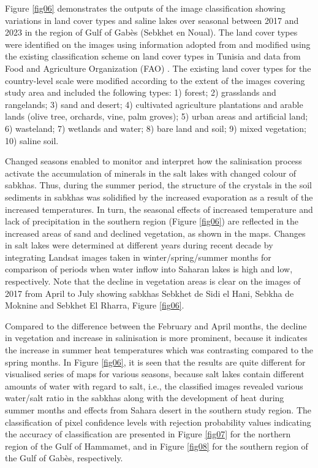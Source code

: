 \documentclass[environments,article,submit,pdftex,moreauthors]{Definitions/mdpi}
\begin{document}
Figure \ref{fig06} demonstrates the outputs of the image classification showing variations in land cover types and saline lakes over seasonal between 2017 and 2023 in the region of Gulf of Gabès (Sebkhet en Noual). The land cover types were identified on the images using information adopted from and modified using the existing classification scheme on land cover types in Tunisia \cite{plants10102031} and data from Food and Agriculture Organization (FAO) \cite{FAO}. The existing land cover types for the country-level scale were modified according to the extent of the images covering study area and included the following types: 1) forest; 2) grasslands and rangelands; 3) sand and desert; 4) cultivated agriculture plantations and arable lands (olive tree, orchards, vine, palm groves); 5) urban areas and artificial land; 6) wasteland; 7) wetlands and water; 8) bare land and soil; 9) mixed vegetation; 10) saline soil. 

Changed seasons enabled to monitor and interpret how the salinisation process activate the accumulation of minerals in the salt lakes with changed colour of sabkhas. Thus, during the summer period, the structure of the crystals in the soil sediments in sabkhas was solidified by the increased evaporation as a result of the increased temperatures. In turn, the seasonal effects of increased temperature and lack of precipitation in the southern region (Figure \ref{fig06}) are reflected in the increased areas of sand and declined vegetation, as shown in the maps. Changes in salt lakes were determined at different years during recent decade by integrating Landsat images taken in winter/spring/summer months for comparison of periods when water inflow into Saharan lakes is high and low, respectively. Note that the decline in vegetation areas is clear on the images of 2017 from April to July showing sabkhas Sebkhet de Sidi el Hani, Sebkha de Moknine  and Sebkhet El Rharra, Figure \ref{fig06}. 

Compared to the difference between the February and April months, the decline in vegetation and increase in salinisation is more prominent, because it indicates the increase in summer heat temperatures which was contrasting compared to the spring months. In Figure \ref{fig06}, it is seen that the results are quite different for visualised series of maps for various seasons, because salt lakes contain different amounts of water with regard to salt, i.e., the classified images revealed various water/salt ratio in the sabkhas along with the development of heat during summer months and effects from Sahara desert in the southern study region. The classification of pixel confidence levels with rejection probability values indicating the accuracy of classification are presented in Figure \ref{fig07} for the northern region of the Gulf of Hammamet, and in Figure \ref{fig08} for the southern region of the Gulf of Gabès, respectively.
\end{document}
